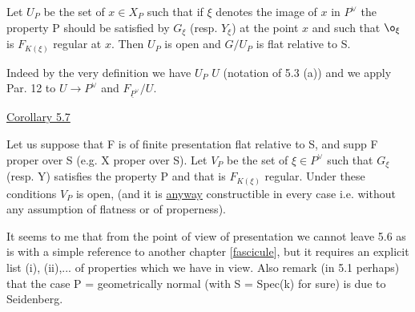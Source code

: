 
Let $U_{P}$ be the set of $x \in X_{P}$ such that if $\xi$ denotes the image of $x$
in $P^{\vee}$ the property P should be satisfied by $G_{\xi}$ (resp. $Y_{\xi}$) at the
point $x$ and such that $\o_{\xi}$ is $F_{K(\xi)}$ regular at $x$.  Then $U_{P}$ is open and
$G/U_{P}$ is flat relative to S.

Indeed by the very definition we have $U_{P}$ \quad $U$ (notation of 5.3
(a)) and we apply Par. 12 to $U \to P^{\vee}$ and $F_{\underline{P}^{\vee}}/U$.

\uline{Corollary 5.7}

Let us suppose that F is of finite presentation flat relative
to S, and supp F proper over S (e.g. X proper over S).  Let $V_{P}$ be
the set of $\xi \in P^{\vee}$ such that $G_{\xi}$ (resp. Y) satisfies the property P
and that is $F_{K(\xi)}$ regular.  Under these conditions $V_{P}$ is open, (and
it is \uline{anyway} constructible in every case i.e. without any
assumption of flatness or of properness).

It seems to me that from the point of view of presentation we
cannot leave 5.6 as is with a simple reference to another chapter
[\uline{fascicule}], but it requires an explicit list (i), (ii),... of
properties which we have in view.  Also remark (in 5.1 perhaps)
that the case P = geometrically normal (with S = Spec(k) for sure)
is due to Seidenberg.
